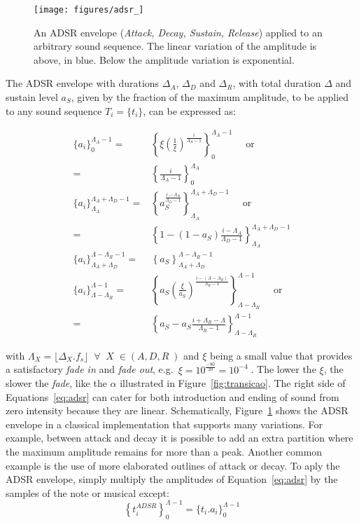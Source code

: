 \begin{figure}[htp!]
    \centering
        \texttt{[image: figures/adsr\_]}
    \caption{An ADSR envelope (\emph{Attack, Decay, Sustain, Release}) applied to an arbitrary sound sequence. The linear variation of the amplitude is above, in blue. Below the amplitude variation is exponential.}
        \label{fig:adsr}
\end{figure}

The ADSR envelope with durations $\Delta_A$, $\Delta_D$ and $\Delta_R$, with total duration $\Delta$ and sustain level $a_S$, given by the fraction of the maximum amplitude, to be applied to any sound sequence $T_i=\{t_i\}$, can be expressed as:

\begin{equation}\label{eq:adsr}
\begin{split}
\{a_i\}_0^{\Lambda_A-1}  = & \left\{\xi\left(\frac{1}{\xi}\right)^{\frac{i}{\Lambda_A-1}}\right\}_0^{\Lambda_A-1} \quad \text{ or }\\ = & \left\{\frac{i}{\Lambda_A-1}\right\}_0^{\Lambda_A}\\
\{a_i\}_{\Lambda_A}^{\Lambda_A+\Lambda_D-1} = & \left\{a_S^{\frac{i-\Lambda_A}{\Lambda_D-1}}  \right\}_{\Lambda_A}^{\Lambda_A+\Lambda_D-1} \quad \text{ or } \\ = &  \left\{1-(1-a_S)\frac{i-\Lambda_A}{\Lambda_D-1}\right\}_{\Lambda_A}^{\Lambda_A+\Lambda_D-1}\\
\{ a_i \}_{\Lambda_A+\Lambda_D}^{\Lambda-\Lambda_R-1} = & \left\{ a_S \right\}_{\Lambda_A+\Lambda_D}^{\Lambda-\Lambda_R-1} \\
\{ a_i \}_{\Lambda-\Lambda_R}^{\Lambda-1}  = & \left\{ a_S\left(\frac{\xi}{a_S} \right)^{\frac{i-(\Lambda-\Lambda_R)}{\Lambda_R-1}} \right\}_{\Lambda-\Lambda_R}^{\Lambda-1} \quad \text{ or } \\ = &  \left\{ a_S - a_S\frac{i+\Lambda_R-\Lambda}{\Lambda_R-1}\right\}_{\Lambda-\Lambda_R}^{\Lambda-1} 
\end{split}
\end{equation}


\noindent with $\Lambda_X=\lfloor \Delta_X . f_s \rfloor\;\;\forall\;\; X \; \in
(A,D,R\;)$ and $\xi$ being a small value that provides a satisfactory \emph{fade in} and \emph{fade out}, e.g.\ $\xi=10^{\frac{-80}{20}}=10^{-4}\;$. The lower the $\xi$, the slower the \emph{fade}, like the $\alpha$ illustrated in Figure~\ref{fig:transicao}. The right side of Equations~\ref{eq:adsr} can cater for both introduction and ending of sound from zero intensity because they are linear. Schematically, Figure~\ref{fig:adsr} shows the ADSR envelope in a classical implementation that supports many variations. For example, between attack and decay it is possible to add an extra partition where the maximum amplitude remains for more than a peak. Another common example is the use of more elaborated outlines of attack or decay.
To aply the ADSR envelope, simply multiply the amplitudes of Equation~\ref{eq:adsr} by the samples of the note or musical except:
\begin{equation}\label{eq:adsrApl}
\left\{t_i^{ADSR}\right\}_0^{\Lambda-1} =\{t_i . a_i\}_0^{\Lambda-1}
\end{equation}


